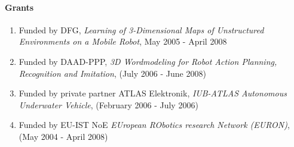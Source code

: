 \paragraph{Grants}
\begin{enumerate}
\item Funded by DFG,  \emph{Learning of 3-Dimensional Maps of
Unstructured
Environments on a Mobile Robot}, May 2005 - April 2008 \\


\item Funded by DAAD-PPP,  \emph{3D Wordmodeling for Robot Action
Planning, Recognition and Imitation}, (July 2006 - June 2008) \\


\item Funded by private partner ATLAS Elektronik,
\emph{IUB-ATLAS Autonomous Underwater Vehicle}, (February 2006 - July 2006)\\


\item Funded by EU-IST NoE \emph{EUropean RObotics research
Network (EURON)}, (May 2004 - April 2008)

\end{enumerate}


\nocite{BirkMultiMap_IEEEproc}
\nocite{birkRescRobARJ06}
\nocite{birk_CommExpore_CEP06}
\nocite{birk_rescueteam_rcup05}
\nocite{birk_rugbot_ssrr06}
\nocite{birk_autonomy_ssrr06}
\nocite{birk_commexplore_rcup05}
\nocite{birk_virtualrobot_rcup05}
\nocite{birk_rescueGUI_rcup05}
\nocite{birk_rescuecabledrum_rcup05}
\nocite{birk_flipper_rcup06}
\nocite{birk_mapvectorization_rcup06}



























%
